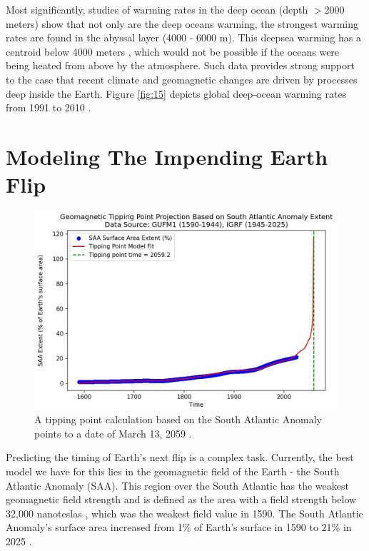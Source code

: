 \documentclass[10pt,twocolumn,letterpaper]{article}
\begin{document}
Most significantly, studies of warming rates in the deep ocean (depth $>$2000 meters) show that not only are the deep oceans warming, the strongest warming rates are found in the abyssal layer (4000 - 6000 m). This deepsea warming has a centroid below 4000 meters \cite{132,129}, which would not be possible if the oceans were being heated from above by the atmosphere. Such data provides strong support to the case that recent climate and geomagnetic changes are driven by processes deep inside the Earth. Figure \ref{fig:15} depicts global deep-ocean warming rates from 1991 to 2010 \cite{132}.

\section{Modeling The Impending Earth Flip}

\begin{figure}[b]
\begin{center}
   \includegraphics[width=1\linewidth]{saa-crop.jpeg}
\end{center}
   \caption{A tipping point calculation based on the South Atlantic Anomaly points to a date of March 13, 2059 \cite{125,126}.}
\label{fig:16}
\label{fig:onecol}
\end{figure}

Predicting the timing of Earth's next flip is a complex task. Currently, the best model we have for this lies in the geomagnetic field of the Earth - the South Atlantic Anomaly (SAA). This region over the South Atlantic has the weakest geomagnetic field strength and is defined as the area with a field strength below 32,000 nanoteslas \cite{135}, which was the weakest field value in 1590. The South Atlantic Anomaly's surface area increased from 1\% of Earth's surface in 1590 to 21\% in 2025 \cite{136}.
\end{document}
